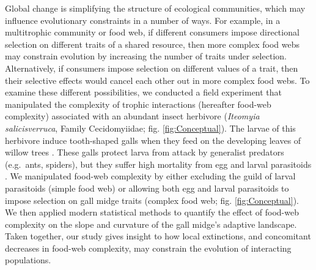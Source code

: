 \documentclass[11pt,]{article}
\begin{document}
Global change is simplifying the structure of ecological communities,
which may influence evolutionary constraints in a number of ways. For
example, in a multitrophic community or food web, if different consumers
impose directional selection on different traits of a shared resource,
then more complex food webs may constrain evolution by increasing the
number of traits under selection. Alternatively, if consumers impose
selection on different values of a trait, then their selective effects
would cancel each other out in more complex food webs. To examine these
different possibilities, we conducted a field experiment that
manipulated the complexity of trophic interactions (hereafter food-web
complexity) associated with an abundant insect herbivore (\emph{Iteomyia
salicisverruca}, Family Cecidomyiidae; fig. \ref{fig:Conceptual}). The
larvae of this herbivore induce tooth-shaped galls when they feed on the
developing leaves of willow trees \citep[\emph{Salix}
sp.,][]{Russo2006}. These galls protect larva from attack by generalist
predators (e.g.~ants, spiders), but they suffer high mortality from egg
and larval parasitoids \citep{Barbour2016}. We manipulated food-web
complexity by either excluding the guild of larval parasitoids (simple
food web) or allowing both egg and larval parasitoids to impose
selection on gall midge traits (complex food web; fig.
\ref{fig:Conceptual}). We then applied modern statistical methods to
quantify the effect of food-web complexity on the slope and curvature of
the gall midge's adaptive landscape. Taken together, our study gives
insight to how local extinctions, and concomitant decreases in food-web
complexity, may constrain the evolution of interacting populations.
\end{document}
